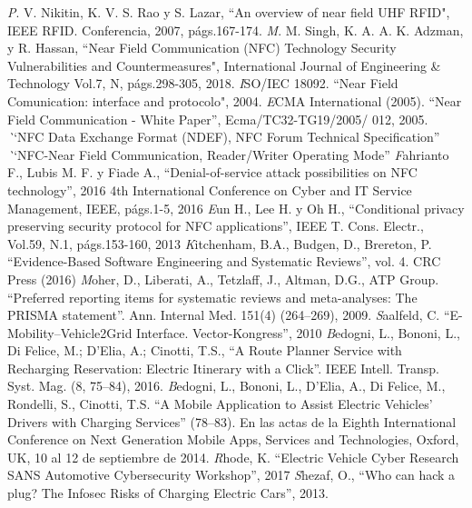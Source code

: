 \documentclass[12pt,a4paper,onecolumn,oneside]{report}
\begin{document}
\begin{thebibliography}{1}
	
 \textit P. V. Nikitin, K. V. S. Rao y S. Lazar, ``An overview of near field UHF RFID", IEEE RFID. Conferencia, 2007, p\'ags.167-174.
 \textit M. M. Singh, K. A. A. K. Adzman, y R. Hassan, ``Near Field Communication (NFC) Technology Security Vulnerabilities and Countermeasures", International Journal of Engineering \& Technology Vol.7, N, p\'ags.298-305, 2018.
 \textit ISO/IEC 18092. ``Near Field Comunication: interface and protocolo", 2004.
 \textit ECMA International (2005). ``Near Field Communication - White Paper”, Ecma/TC32-TG19/2005/ 012, 2005.
 \textit ``NFC Data Exchange Format (NDEF), NFC Forum Technical Specification”
 \textit ``NFC-Near Field Communication, Reader/Writer Operating Mode”
 \textit Fahrianto F., Lubis M. F. y Fiade A., ``Denial-of-service attack possibilities on NFC technology”, 2016 4th International Conference on Cyber and IT Service Management, IEEE, págs.1-5, 2016
 \textit Eun H., Lee H. y Oh H., ``Conditional privacy preserving security protocol for NFC applications”, IEEE T. Cons. Electr., Vol.59, N\textdegree.1, págs.153-160, 2013
 \textit Kitchenham, B.A., Budgen, D., Brereton, P. ``Evidence-Based Software Engineering and Systematic Reviews”, vol. 4. CRC Press (2016)
 \textit Moher, D., Liberati, A., Tetzlaff, J., Altman, D.G., ATP Group. ``Preferred reporting
items for systematic reviews and meta-analyses: The PRISMA statement”. Ann. Internal Med. 151(4) (264–269), 2009.
 \textit Saalfeld, C. ``E-Mobility–Vehicle2Grid Interface. Vector-Kongress”, 2010
 \textit Bedogni, L., Bononi, L., Di Felice, M.; D’Elia, A.; Cinotti, T.S., ``A Route Planner Service with Recharging
Reservation: Electric Itinerary with a Click”. IEEE Intell. Transp. Syst. Mag. (8, 75–84), 2016.
 \textit Bedogni, L., Bononi, L., D’Elia, A., Di Felice, M., Rondelli, S., Cinotti, T.S. ``A Mobile Application to Assist
Electric Vehicles’ Drivers with Charging Services” (78–83). En las actas de la Eighth International Conference on Next Generation Mobile Apps, Services and Technologies, Oxford, UK, 10 al 12 de septiembre de 2014.
 \textit Rhode, K. ``Electric Vehicle Cyber Research SANS Automotive Cybersecurity Workshop”, 2017
 \textit Shezaf, O., ``Who can hack a plug? The Infosec Risks of Charging Electric Cars”, 2013.

\end{thebibliography}
\end{document}

